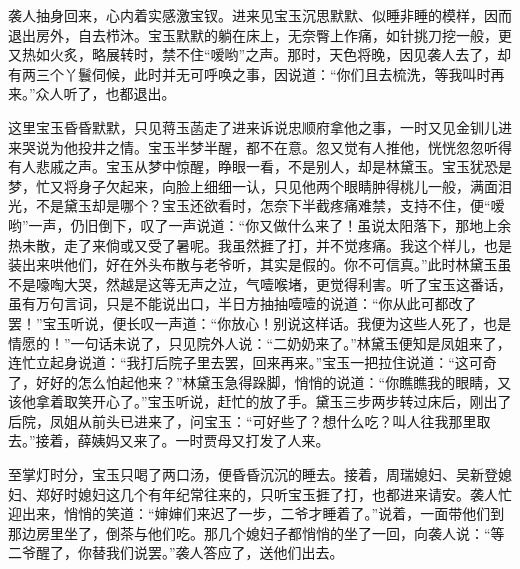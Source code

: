 \documentclass[12pt,oneside]{book}
\begin{document}
袭人抽身回来，心内着实感激宝钗。进来见宝玉沉思默默、似睡非睡的模样，因而退出房外，自去栉沐。宝玉默默的躺在床上，无奈臀上作痛，如针挑刀挖一般，更又热如火炙，略展转时，禁不住“嗳哟”之声。那时，天色将晚，因见袭人去了，却有两三个丫鬟伺候，此时并无可呼唤之事，因说道：“你们且去梳洗，等我叫时再来。”众人听了，也都退出。

这里宝玉昏昏默默，只见蒋玉菡走了进来诉说忠顺府拿他之事，一时又见金钏儿进来哭说为他投井之情。宝玉半梦半醒，都不在意。忽又觉有人推他，恍恍忽忽听得有人悲戚之声。宝玉从梦中惊醒，睁眼一看，不是别人，却是林黛玉。宝玉犹恐是梦，忙又将身子欠起来，向脸上细细一认，只见他两个眼睛肿得桃儿一般，满面泪光，不是黛玉却是哪个？宝玉还欲看时，怎奈下半截疼痛难禁，支持不住，便“嗳哟”一声，仍旧倒下，叹了一声说道：“你又做什么来了！虽说太阳落下，那地上余热未散，走了来倘或又受了暑呢。我虽然捱了打，并不觉疼痛。我这个样儿，也是装出来哄他们，好在外头布散与老爷听，其实是假的。你不可信真。”此时林黛玉虽不是嚎啕大哭，然越是这等无声之泣，气噎喉堵，更觉得利害。听了宝玉这番话，虽有万句言词，只是不能说出口，半日方抽抽噎噎的说道：“你从此可都改了罢！”宝玉听说，便长叹一声道：“你放心！别说这样话。我便为这些人死了，也是情愿的！”一句话未说了，只见院外人说：“二奶奶来了。”林黛玉便知是凤姐来了，连忙立起身说道：“我打后院子里去罢，回来再来。”宝玉一把拉住说道：“这可奇了，好好的怎么怕起他来？”林黛玉急得跺脚，悄悄的说道：“你瞧瞧我的眼睛，又该他拿着取笑开心了。”宝玉听说，赶忙的放了手。黛玉三步两步转过床后，刚出了后院，凤姐从前头已进来了，问宝玉：“可好些了？想什么吃？叫人往我那里取去。”接着，薛姨妈又来了。一时贾母又打发了人来。

至掌灯时分，宝玉只喝了两口汤，便昏昏沉沉的睡去。接着，周瑞媳妇、吴新登媳妇、郑好时媳妇这几个有年纪常往来的，只听宝玉捱了打，也都进来请安。袭人忙迎出来，悄悄的笑道：“婶婶们来迟了一步，二爷才睡着了。”说着，一面带他们到那边房里坐了，倒茶与他们吃。那几个媳妇子都悄悄的坐了一回，向袭人说：“等二爷醒了，你替我们说罢。”袭人答应了，送他们出去。
\end{document}
